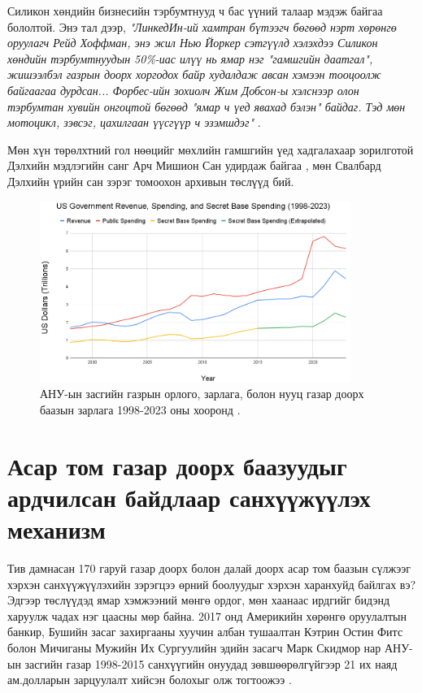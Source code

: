 \documentclass[10pt,twocolumn,letterpaper]{article}
\begin{document}
Силикон хөндийн бизнесийн тэрбумтнууд ч бас үүний талаар мэдэж байгаа бололтой. Энэ тал дээр, \textit{"ЛинкедИн-ий хамтран бүтээгч бөгөөд нэрт хөрөнгө оруулагч Рейд Хоффман, энэ жил Нью Йоркер сэтгүүлд хэлэхдээ Силикон хөндийн тэрбумтнуудын 50\%-иас илүү нь ямар нэг "гамшгийн даатгал", жишээлбэл газрын доорх хоргодох байр худалдаж авсан хэмээн тооцоолж байгаагаа дурдсан... Форбес-ийн зохиолч Жим Добсон-ы хэлснээр олон тэрбумтан хувийн онгоцтой бөгөөд "ямар ч үед явахад бэлэн" байдаг. Тэд мөн мотоцикл, зэвсэг, цахилгаан үүсгүүр ч эзэмшдэг"} \cite{28}.

Мөн хүн төрөлхтний гол нөөцийг мөхлийн гамшгийн үед хадгалахаар зорилготой Дэлхийн мэдлэгийн санг Арч Мишион Сан удирдаж байгаа \cite{29}, мөн Свалбард Дэлхийн үрийн сан \cite{30} зэрэг томоохон архивын төслүүд бий.
\begin{figure}[t]
\begin{center}
\includegraphics[width=0.9\textwidth]{govcrop2.png}
\end{center}
   \caption{АНУ-ын засгийн газрын орлого, зарлага, болон нууц газар доорх баазын зарлага 1998-2023 оны хооронд \cite{19}.}
   \label{fig:9}
\end{figure}
\section{Асар том газар доорх баазуудыг ардчилсан байдлаар санхүүжүүлэх механизм}

Тив дамнасан 170 гаруй газар доорх болон далай доорх асар том баазын сүлжээг хэрхэн санхүүжүүлэхийн зэрэгцээ өрний боолуудыг хэрхэн харанхуйд байлгах вэ? Эдгээр төслүүдэд ямар хэмжээний мөнгө ордог, мөн хаанаас ирдгийг бидэнд харуулж чадах нэг цаасны мөр байна. 2017 онд Америкийн хөрөнгө оруулалтын банкир, Бушийн засаг захиргааны хуучин албан тушаалтан Кэтрин Остин Фитс болон Мичиганы Мужийн Их Сургуулийн эдийн засагч Марк Скидмор нар АНУ-ын засгийн газар 1998-2015 санхүүгийн онуудад зөвшөөрөлгүйгээр 21 их наяд ам.долларын зарцуулалт хийсэн болохыг олж тогтоожээ \cite{11,12,13}.
\end{document}

